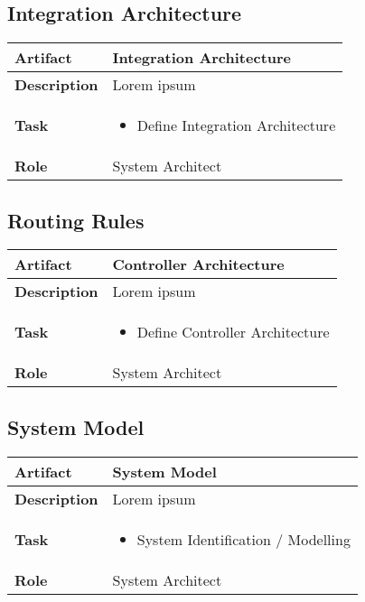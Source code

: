 \subsection{Integration Architecture}
\begin{minipage}{\textwidth}
 \label{table:ch6_Artifact_Integration_Architecture}
\begin{tabular}
	{|m{2cm}|m{10cm}|} \hline \bfseries Artifact & Integration Architecture\\
	\hline \bfseries Description & Lorem ipsum\\
	\hline \bfseries Task & 
	\begin{itemize}
		\item Define Integration Architecture 
	\end{itemize}
	\\
	\hline \bfseries Role & System Architect\\
	\hline 
\end{tabular}
\end{minipage}

\subsection{Routing Rules}
\begin{minipage}{\textwidth}
 \label{table:ch6_Artifact_Routing_Rules}
\begin{tabular}
	{|m{2cm}|m{10cm}|} \hline \bfseries Artifact & Controller Architecture\\
	\hline \bfseries Description & Lorem ipsum\\
	\hline \bfseries Task & 
	\begin{itemize}
		\item Define Controller Architecture 
	\end{itemize}
	\\
	\hline \bfseries Role & System Architect\\
	\hline 
\end{tabular}
\end{minipage}

\subsection{System Model}
\begin{minipage}{\textwidth}
 \label{table:ch6_Artifact_System_Model}
\begin{tabular}
	{|m{2cm}|m{10cm}|} \hline \bfseries Artifact & System Model\\
	\hline \bfseries Description & Lorem ipsum\\
	\hline \bfseries Task & 
	\begin{itemize}
		\item System Identification / Modelling
	\end{itemize}
	\\
	\hline \bfseries Role & System Architect\\
	\hline 
\end{tabular}
\end{minipage}

